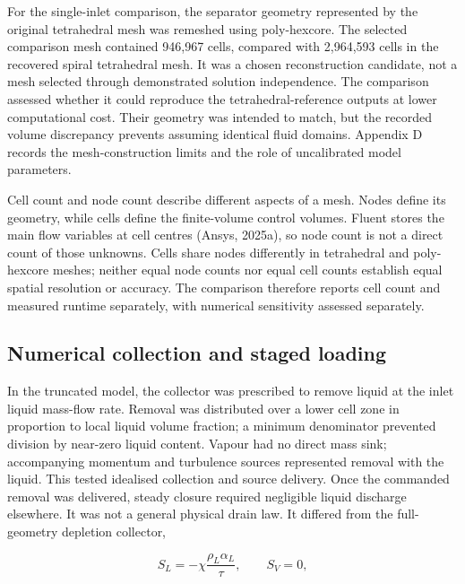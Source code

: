 For the single-inlet comparison, the separator geometry represented by the original tetrahedral mesh was remeshed using poly-hexcore. The selected comparison mesh contained 946,967 cells, compared with 2,964,593 cells in the recovered spiral tetrahedral mesh. It was a chosen reconstruction candidate, not a mesh selected through demonstrated solution independence. The comparison assessed whether it could reproduce the tetrahedral-reference outputs at lower computational cost. Their geometry was intended to match, but the recorded volume discrepancy prevents assuming identical fluid domains. Appendix D records the mesh-construction limits and the role of uncalibrated model parameters.

Cell count and node count describe different aspects of a mesh. Nodes define its geometry, while cells define the finite-volume control volumes. Fluent stores the main flow variables at cell centres (Ansys, 2025a), so node count is not a direct count of those unknowns. Cells share nodes differently in tetrahedral and poly-hexcore meshes; neither equal node counts nor equal cell counts establish equal spatial resolution or accuracy. The comparison therefore reports cell count and measured runtime separately, with numerical sensitivity assessed separately.

\subsection{Numerical collection and staged loading}

In the truncated model, the collector was prescribed to remove liquid at the inlet liquid mass-flow rate. Removal was distributed over a lower cell zone in proportion to local liquid volume fraction; a minimum denominator prevented division by near-zero liquid content. Vapour had no direct mass sink; accompanying momentum and turbulence sources represented removal with the liquid. This tested idealised collection and source delivery. Once the commanded removal was delivered, steady closure required negligible liquid discharge elsewhere. It was not a general physical drain law. It differed from the full-geometry depletion collector,

\[S_L=-\chi\frac{\rho_L\alpha_L}{\tau},\qquad S_V=0,\]


